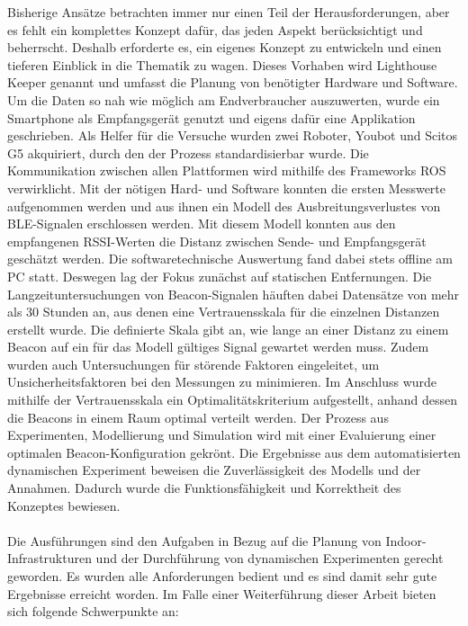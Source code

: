 Bisherige Ansätze betrachten immer nur einen Teil der Herausforderungen, aber es fehlt ein komplettes Konzept dafür, das jeden Aspekt berücksichtigt und beherrscht. Deshalb erforderte es, ein eigenes Konzept zu entwickeln und einen tieferen Einblick in die Thematik zu wagen. Dieses Vorhaben wird Lighthouse Keeper genannt und umfasst die Planung von benötigter Hardware und Software. Um die Daten so nah wie möglich am Endverbraucher auszuwerten, wurde ein Smartphone als Empfangsgerät genutzt und eigens dafür eine Applikation geschrieben. Als Helfer für die Versuche wurden zwei Roboter, Youbot und Scitos G5 akquiriert, durch den der Prozess standardisierbar wurde. Die Kommunikation zwischen allen Plattformen wird mithilfe des Frameworks ROS verwirklicht. Mit der nötigen Hard- und Software konnten die ersten Messwerte aufgenommen werden und aus ihnen ein Modell des Ausbreitungsverlustes von BLE-Signalen erschlossen werden. Mit diesem Modell konnten aus den empfangenen RSSI-Werten die Distanz zwischen Sende- und Empfangsgerät geschätzt werden. Die softwaretechnische Auswertung fand dabei stets offline am PC statt. Deswegen lag der Fokus zunächst auf statischen Entfernungen. Die Langzeituntersuchungen von Beacon-Signalen häuften dabei Datensätze von mehr als 30 Stunden an, aus denen eine Vertrauensskala für die einzelnen Distanzen erstellt wurde. Die definierte Skala gibt an, wie lange an einer Distanz zu einem Beacon auf ein für das Modell gültiges Signal gewartet werden muss. Zudem wurden auch Untersuchungen für störende Faktoren eingeleitet, um Unsicherheitsfaktoren bei den Messungen zu minimieren. Im Anschluss wurde mithilfe der Vertrauensskala ein Optimalitätskriterium aufgestellt, anhand dessen die Beacons in einem Raum optimal verteilt werden. Der Prozess aus Experimenten, Modellierung und Simulation wird mit einer Evaluierung einer optimalen Beacon-Konfiguration gekrönt. Die Ergebnisse aus dem automatisierten dynamischen Experiment beweisen die Zuverlässigkeit des Modells und der Annahmen. Dadurch wurde die Funktionsfähigkeit und Korrektheit des Konzeptes bewiesen.\\ \\   
Die Ausführungen sind den Aufgaben in Bezug auf die Planung von Indoor-Infrastrukturen und der Durchführung von dynamischen Experimenten gerecht geworden. Es wurden alle Anforderungen bedient und es sind damit sehr gute Ergebnisse erreicht worden. Im Falle einer Weiterführung dieser Arbeit bieten sich folgende Schwerpunkte an:
